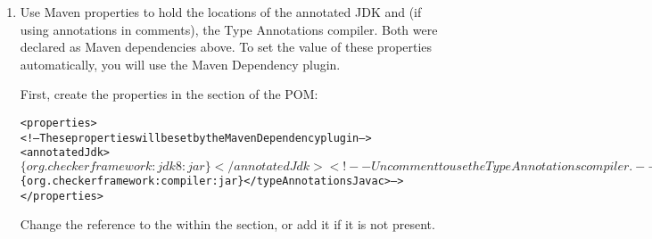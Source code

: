 \begin{enumerate}
\begin{enumerate}
\begin{alltt}
  <dependencies>
    ... existing <dependency> items ...

    <!-- Annotations from the Checker Framework: nullness, interning, locking, ... -->
    <dependency>
      <groupId>org.checkerframework</groupId>
      <artifactId>checker-qual</artifactId>
      <version>\$\{checkerframework.version\}</version>
      <scope>system</scope>
      <systemPath>\$\{env.CHECKERFRAMEWORK\}/checker/dist/checker-qual.jar</systemPath>
    </dependency>
    <dependency>
      <groupId>org.checkerframework</groupId>
      <artifactId>checker</artifactId>
      <version>\$\{checkerframework.version\}</version>
      <scope>system</scope>
      <systemPath>\$\{env.CHECKERFRAMEWORK\}/checker/dist/checker.jar</systemPath>
    </dependency>
    <!-- The Type Annotations compiler. Uncomment if using annotations in comments. -->
    <!-- <dependency>
      <groupId>org.checkerframework</groupId>
      <artifactId>compiler</artifactId>
      <version>\$\{checkerframework.version\}</version>
      <scope>system</scope>
      <systemPath>\$\{env.CHECKERFRAMEWORK\}/checker/dist/compiler.jar</systemPath>
    </dependency> -->
    <!-- The annotated JDK to use. -->
    <dependency>
      <groupId>org.checkerframework</groupId>
      <artifactId>jdk8</artifactId>
      <version>\$\{checkerframework.version\}</version>
      <scope>system</scope>
      <systemPath>\$\{env.CHECKERFRAMEWORK\}/checker/dist/jdk8.jar</systemPath>
    </dependency>
  </dependencies>
\end{alltt}
\end{enumerate}


\item Use Maven properties to hold the locations of the
  annotated JDK and (if using annotations in comments), the Type Annotations compiler.  Both were declared as Maven dependencies above.
To set the value of these properties automatically, you will use the Maven Dependency plugin.

First, create the properties in the  section of the POM:

\begin{alltt}
<properties>
  <!-- These properties will be set by the Maven Dependency plugin -->
  <annotatedJdk>$\{org.checkerframework:jdk8:jar\}</annotatedJdk>
  <!-- Uncomment to use the Type Annotations compiler. -->
  <!-- <typeAnnotationsJavac>$\{org.checkerframework:compiler:jar\}</typeAnnotationsJavac> -->
</properties>
\end{alltt}

Change the reference to the  within the 
section, or add it if it is not present.


\end{enumerate}
